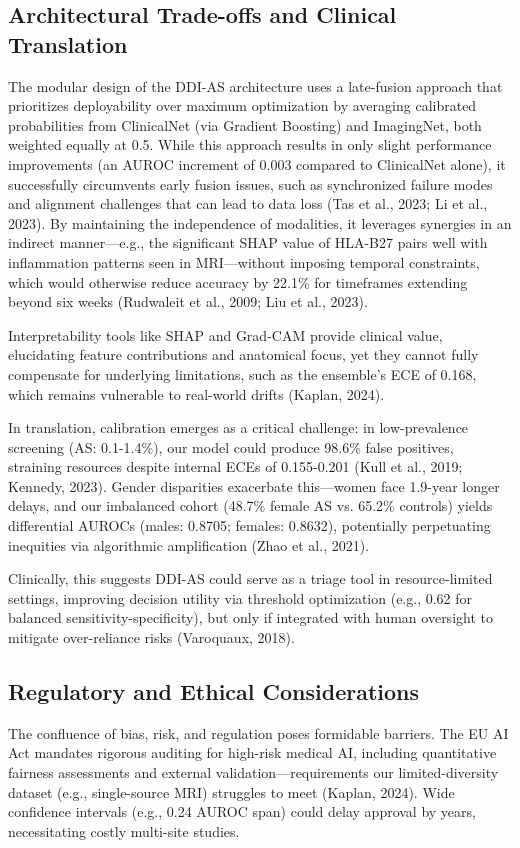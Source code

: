 \documentclass[12pt, a4paper]{article}
\begin{document}
\subsection{Architectural Trade-offs and Clinical Translation}
The modular design of the DDI-AS architecture uses a late-fusion approach that prioritizes deployability over maximum optimization by averaging calibrated probabilities from ClinicalNet (via Gradient Boosting) and ImagingNet, both weighted equally at 0.5. While this approach results in only slight performance improvements (an AUROC increment of 0.003 compared to ClinicalNet alone), it successfully circumvents early fusion issues, such as synchronized failure modes and alignment challenges that can lead to data loss (Tas et al., 2023; Li et al., 2023). By maintaining the independence of modalities, it leverages synergies in an indirect manner—e.g., the significant SHAP value of HLA-B27 pairs well with inflammation patterns seen in MRI—without imposing temporal constraints, which would otherwise reduce accuracy by 22.1\% for timeframes extending beyond six weeks (Rudwaleit et al., 2009; Liu et al., 2023).

Interpretability tools like SHAP and Grad-CAM provide clinical value, elucidating feature contributions and anatomical focus, yet they cannot fully compensate for underlying limitations, such as the ensemble's ECE of 0.168, which remains vulnerable to real-world drifts (Kaplan, 2024).

In translation, calibration emerges as a critical challenge: in low-prevalence screening (AS: 0.1-1.4\%), our model could produce 98.6\% false positives, straining resources despite internal ECEs of 0.155-0.201 (Kull et al., 2019; Kennedy, 2023). Gender disparities exacerbate this—women face 1.9-year longer delays, and our imbalanced cohort (48.7\% female AS vs. 65.2\% controls) yields differential AUROCs (males: 0.8705; females: 0.8632), potentially perpetuating inequities via algorithmic amplification (Zhao et al., 2021). 

Clinically, this suggests DDI-AS could serve as a triage tool in resource-limited settings, improving decision utility via threshold optimization (e.g., 0.62 for balanced sensitivity-specificity), but only if integrated with human oversight to mitigate over-reliance risks (Varoquaux, 2018).

\subsection{Regulatory and Ethical Considerations}
The confluence of bias, risk, and regulation poses formidable barriers. The EU AI Act mandates rigorous auditing for high-risk medical AI, including quantitative fairness assessments and external validation—requirements our limited-diversity dataset (e.g., single-source MRI) struggles to meet (Kaplan, 2024). Wide confidence intervals (e.g., 0.24 AUROC span) could delay approval by years, necessitating costly multi-site studies. 
\end{document}
